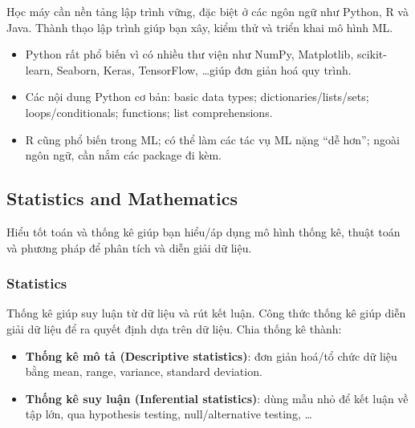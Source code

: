 \begin{ynghia}[title={Vì sao cần lập trình?}]
Học máy cần nền tảng lập trình vững, đặc biệt ở các ngôn ngữ như Python, R và Java.
Thành thạo lập trình giúp bạn xây, kiểm thử và triển khai mô hình ML.
\end{ynghia}

\begin{phuongphap}[title={Python và R}]
\begin{itemize}
  \item Python rất phổ biến vì có nhiều thư viện như NumPy, Matplotlib, scikit-learn, Seaborn, Keras, TensorFlow, \ldots giúp đơn giản hoá quy trình.
  \item Các nội dung Python cơ bản: basic data types; dictionaries/lists/sets; loops/conditionals; functions; list comprehensions.
  \item R cũng phổ biến trong ML; có thể làm các tác vụ ML nặng “dễ hơn”; ngoài ngôn ngữ, cần nắm các package đi kèm.
\end{itemize}
\end{phuongphap}

\subsection{Statistics and Mathematics}

\begin{dongco}[title={Toán--thống kê là nền để hiểu mô hình}]
Hiểu tốt toán và thống kê giúp bạn hiểu/áp dụng mô hình thống kê, thuật toán và phương pháp để phân tích và diễn giải dữ liệu.
\end{dongco}

\subsubsection{Statistics}
\begin{ynghia}[title={Thống kê dùng để làm gì?}]
Thống kê giúp suy luận từ dữ liệu và rút kết luận.
Công thức thống kê giúp diễn giải dữ liệu để ra quyết định dựa trên dữ liệu.
Chia thống kê thành:
\begin{itemize}
  \item \textbf{Thống kê mô tả (Descriptive statistics)}: đơn giản hoá/tổ chức dữ liệu bằng mean, range, variance, standard deviation.
  \item \textbf{Thống kê suy luận (Inferential statistics)}: dùng mẫu nhỏ để kết luận về tập lớn, qua hypothesis testing, null/alternative testing, \ldots
\end{itemize}
\end{ynghia}


